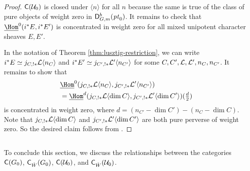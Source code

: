 \documentclass[a4paper,10pt,leqno]{amsart}
\theoremstyle{plain}
\theoremstyle{plain}
\theoremstyle{plain}
\theoremstyle{definition}
\theoremstyle{remark}
\newcommand{\point}{\mathit{pt}}
\begin{document}
\begin{proof}
$\sf{C}(\cal{U}_0)$ is closed under $\langle n\rangle$ for all $n$ because the same is true of the class of pure objects of weight zero in $\sf{D}_{G, m}^b(\point_0)$.
It remains to check that $\SHom^0(i^\ast E, i^\ast E')$ is concentrated in weight zero for all mixed unipotent character sheaves $E, E'$.

In the notation of Theorem \ref{thm:lusztig-restriction}, we can write $i^\ast E \simeq j_{C, !\ast} \cal{L}\langle n_C\rangle$ and $i^\ast E' \simeq j_{C', !\ast} \cal{L}'\langle n_{C'}\rangle$ for some $C, C', \cal{L}, \cal{L}', n_C, n_{C'}$.
It remains to show that 
\begin{align}\begin{split}
&\SHom^0(j_{C, !\ast} \cal{L}\langle n_C\rangle, j_{C', !\ast} \cal{L}'\langle n_{C'}\rangle) \\
&= \SHom^{d}(j_{C, !\ast} \cal{L}\langle \dim C\rangle, j_{C', !\ast} \cal{L}'\langle \dim C'\rangle)(\tfrac{d}{2})
\end{split}\end{align}
is concentrated in weight zero, where $d = (n_{C'} - \dim C') - (n_C - \dim C)$.
Note that $j_{C, !\ast} \cal{L}\langle \dim C\rangle$ and $j_{C', !\ast} \cal{L}'\langle \dim C'\rangle$ are both pure perverse of weight zero.
So the desired claim follows from \cite[Cor.\ 4.8]{rr}.
\end{proof}

\subsection{}

To conclude this section, we discuss the relationships between the categories $\sf{C}(G_0)$, $\sf{C}_{\hat{W}}(G_0)$, $\sf{C}(\cal{U}_0)$, and $\sf{C}_{\hat{W}}(\cal{U}_0)$.
\end{document}
